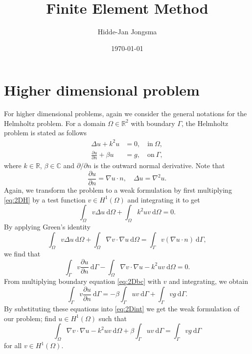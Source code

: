 \documentclass[a4paper]{article}
\author{Hidde-Jan Jongsma}
\title{Finite Element Method}
\date{\today}
\newcommand{\Reals}{\mathbb{R}}
\newcommand{\dd}{\mathrm{d}}
\newcommand{\dun}{\frac{\partial u}{\partial n}}
\newcommand{\lapu}{\nabla^2 u}
\newcommand{\HO}{\ensuremath{H^1(\Omega)}}
\begin{document}
\section{Higher dimensional problem}

For higher dimensional problems, again we consider the general
notations for the Helmholtz problem. For a domain $\Omega \in
\Reals^2$ with boundary $\Gamma$, the Helmholtz problem is stated as
follows
\begin{align}
  \Delta u + k^2 u & = 0, \quad \text{in}\ \Omega, \\
  \frac{\partial u}{\partial n} + \beta u & = g, \quad \text{on}\ \Gamma, \label{eq:2Dbc}
\end{align}
where $k \in \Reals$, $\beta \in \mathbb{C}$ and
${\partial}/{\partial n}$ is the outward normal derivative. Note
that
\begin{equation*}
  \frac{\partial u}{\partial n} = \nabla u \cdot n, \quad \label{eq:2DH}
  \Delta u = \lapu.
\end{equation*}
Again, we transform the problem to a weak formulation by first
multiplying \eqref{eq:2DH} by a test function $v \in \HO$ and
integrating it to get
\begin{equation} \label{eq:2Dint}
  \int_\Omega v \Delta u \ \dd\Omega + \int_\Omega k^2 u v \ \dd\Omega = 0.
\end{equation}
By applying Green's identity
\begin{equation*}
  \int_\Omega v \Delta u \ \dd \Omega
  + \int_\Omega \nabla v \cdot \nabla u \ \dd\Omega
  =
  \int_\Gamma v(\nabla u \cdot n) \ \dd\Gamma,
\end{equation*}
we find that
\begin{equation*}
  \int_\Gamma v \dun \ \dd\Gamma
  - \int_\Omega \nabla v \cdot \nabla u - k^2 u v \ \dd\Omega
  = 0.
\end{equation*}
From multiplying boundary equation \eqref{eq:2Dbc} with $v$ and
integrating, we obtain
\begin{equation*}
  \int_\Gamma v \dun \ \dd\Gamma
  =
  - \beta \int_\Gamma u v \ \dd\Gamma
  + \int_\Gamma v g \ \dd\Gamma.
\end{equation*}
By substituting these equations into \eqref{eq:2Dint} we get the weak
formulation of our problem; find $u \in \HO$ such that
\begin{equation}
  \int_\Omega \nabla v \cdot \nabla u - k^2 u v \ \dd\Omega
  + \beta \int_\Gamma uv \ \dd\Gamma
  = \int_\Gamma v g \ \dd\Gamma
\end{equation}
for all $v \in \HO$.
\end{document}
